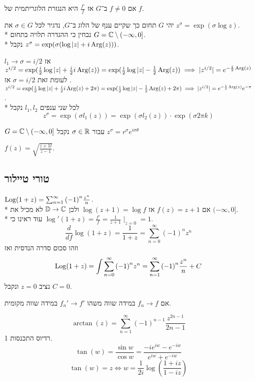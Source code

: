 \begin{definition}
	אם $f \ne 0$ ב־$G$ אז $\frac{f'}{f}$ היא הנגזרת הלוגריתמית של $f$.
\end{definition}
\begin{definition}[n + 1]
	יהי $G$ תחום כך שקיים ענף של הלוג ב־$G$, נדגיר לכל $\sigma \in G$ את $z^\sigma = \exp(\sigma \log z)$. \\*
	נבחין כי ההגדרה תלויה בתחום $G = \mathbb{C} \setminus (-\infty, 0]$. \\* %
	נקבל $z^\sigma = \exp(\sigma(\log|z| + i \operatorname{Arg}(z)))$.
\end{definition}
$l_1 \to \sigma = i / 2$ אז $z^{i / 2} = \exp(\frac{i}{2} \log|z| + \frac{i}{2} i \operatorname{Arg}(z)) = \exp(\frac{i}{2} \log|z| - \frac{1}{2} \operatorname{Arg}(z)) \implies |z^{i/2}| = e^{-\frac{1}{2} \operatorname{Arg}(z)}$.
לעומת זאת
$\sigma = i / 2$ אז $z^{i / 2} = \exp(\frac{i}{2} \log|z| + \frac{i}{2} i \operatorname{Arg}(z) + 2\pi) = \exp(\frac{i}{2} \log|z| - \frac{1}{2} \operatorname{Arg}(z) + 2\pi) \implies |z^{i/2}| = e^{-\frac{1}{2} \operatorname{Arg}(z)} e^{-\pi}$. \\*
לכל שני ענפים $l_1, l_2$ נקבל
\[
	z^\sigma = \exp(\sigma l_1(z)) = \exp(\sigma l_2(z)) \cdot \exp(\sigma 2 \pi k)
\]
\begin{example}
	$G = \mathbb{C} \setminus (-\infty, 0]$ עבור $\sigma \in \mathbb{R}$ נקבל $z^\sigma = r^\sigma e^{i\sigma \theta}$
\end{example}
\begin{example}
	$f(z) = \sqrt{\frac{z + 1l}{z - 1}}$.
\end{example}

\subsection{טורי טיילור}
\begin{example}
	$\operatorname{Log}(1 + z) = \sum_{n = 1}^{\infty} {(-1)}^n \frac{z^n}{n}$. \\*
	אם $f(z) = z + 1$ אז $\log(z + 1) = \log f$ ולכן $\mathbb{D} \to \mathbb{C}$ לא מכיל את $(-\infty, 0]$. \\*
	עוד ראינו כי $\log'(1 + z) = \frac{f'}{f} = \frac{1}{z + 1} \mid_{z = 0} = 1$.
	\[
		\frac{d}{df} \log(1 + z) = \frac{1}{1 + z} = \sum_{n = 0}^{\infty} {(-1)}^n z^n
	\]
	וזהו סכום סדרה הנדסית ואז
	\[
		\operatorname{Log}(1 + z) = \int \sum_{n = 0}^{\infty} {(-1)}^n z^n = \sum_{n = 1}^{\infty} {(-1)}^n \frac{z^n}{n} + C
	\]
	נציב $z = 0$ ונקבל $C = 0$.
\end{example}
\begin{example}
	אם $f_n \to f$ במידה שווה משהו $f_n' \to f'$ במידה שווה מקומית.
\end{example}
\begin{example}
	\[
		\arctan(z) = \sum_{n = 1}^{\infty} {(-1)}^{n - 1} \frac{z^{2n - 1}}{2n - 1}
	\]
	רדיוס התכנסות 1.
	\[
		\tan(w) = \frac{\sin w}{\cos w} = \frac{-i e^{iw} - e^{-iw}}{e^{iw} + e^{-iw}}
	\]
	\[
		\tan(w) = z \iff w = \frac{1}{2i} \log(\frac{1 + iz}{1 - iz})
	\]
\end{example}

